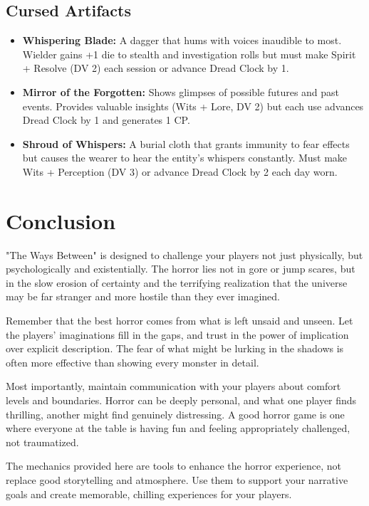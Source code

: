 \documentclass[11pt]{article}
\begin{document}
\subsection{Cursed Artifacts}

\begin{itemize}
\item \textbf{Whispering Blade:} A dagger that hums with voices inaudible to most. Wielder gains +1 die to stealth and investigation rolls but must make Spirit + Resolve (DV 2) each session or advance Dread Clock by 1.
\item \textbf{Mirror of the Forgotten:} Shows glimpses of possible futures and past events. Provides valuable insights (Wits + Lore, DV 2) but each use advances Dread Clock by 1 and generates 1 CP.
\item \textbf{Shroud of Whispers:} A burial cloth that grants immunity to fear effects but causes the wearer to hear the entity's whispers constantly. Must make Wits + Perception (DV 3) or advance Dread Clock by 2 each day worn.
\end{itemize}

\section{Conclusion}

"The Ways Between" is designed to challenge your players not just physically, but psychologically and existentially. The horror lies not in gore or jump scares, but in the slow erosion of certainty and the terrifying realization that the universe may be far stranger and more hostile than they ever imagined.

Remember that the best horror comes from what is left unsaid and unseen. Let the players' imaginations fill in the gaps, and trust in the power of implication over explicit description. The fear of what might be lurking in the shadows is often more effective than showing every monster in detail.

Most importantly, maintain communication with your players about comfort levels and boundaries. Horror can be deeply personal, and what one player finds thrilling, another might find genuinely distressing. A good horror game is one where everyone at the table is having fun and feeling appropriately challenged, not traumatized.

The mechanics provided here are tools to enhance the horror experience, not replace good storytelling and atmosphere. Use them to support your narrative goals and create memorable, chilling experiences for your players.
\end{document}
